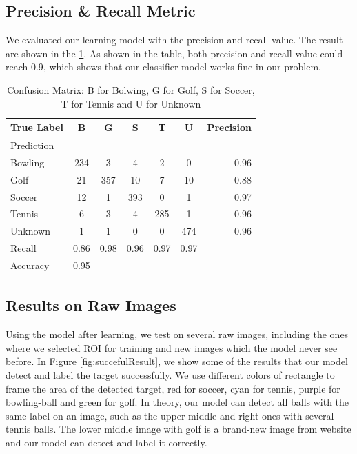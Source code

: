 \documentclass{article}
\begin{document}
\subsection{Precision \& Recall Metric}
We evaluated our learning model with the precision and recall value. The result are shown in the \ref{sample-table}. As shown in the table, both precision and recall value could reach 0.9, which shows that our classifier model works fine in our problem.
\begin{table}[t]
\caption{Confusion Matrix: B for Bolwing, G for Golf, S for Soccer, T for Tennis and U for Unknown}
\label{sample-table}
\vskip 0.15in
\begin{center}
\begin{small}
\begin{sc}
\tabcolsep 0.05in 
\begin{tabular}{lcccccr}


\hline
\abovespace\belowspace
True Label & B & G & S & T & U & Precision \\
\hline
\abovespace
Prediction &   &   &   &    &   &   \\
Bowling    & 234 & 3 & 4 & 2 &0 & 0.96 \\ 
Golf & 21 & 357 & 10 & 7 &10 &0.88\\
Soccer & 12 & 1 & 393 & 0&1 &0.97   \\
Tennis   & 6 & 3 & 4 & 285&1&0.96       \\
Unknown   & 1 & 1 & 0&0 & 474&0.96       \\
\hline
\abovespace
Recall    & 0.86 & 0.98 & 0.96 & 0.97& 0.97 \\
Accuracy &0.95   &   &   &    &   &   \\
\hline
\end{tabular}
\end{sc}
\end{small}
\end{center}
\vskip -0.1in
\end{table}

\subsection{Results on Raw Images}
Using the model after learning, we test on several raw images, including the ones where we selected ROI for training and new images which the model never see before. In Figure \ref{fig:succefulResult}, we show some of the results that our model detect and label the target successfully. We use different colors of rectangle to frame the area of the detected target, red for soccer, cyan for tennis, purple for bowling-ball and green for golf. In theory, our model can detect all balls with the same label on an image, such as the upper middle and right ones with several tennis balls. The lower middle image with golf is a brand-new image from website and our model can detect and label it correctly. \\
\end{document}

